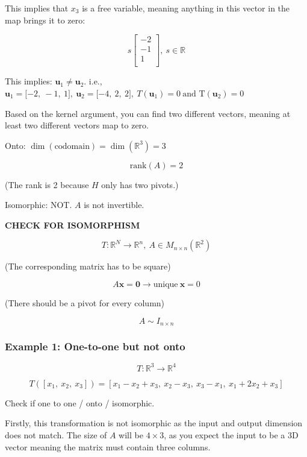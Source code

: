 \documentclass[
]{article}
\begin{document}
This implies that $x_{3}$ is a free variable, meaning anything in this
vector in the map brings it to zero:

$$s\begin{bmatrix}
 - 2 \\
 - 1 \\
1 \\
\end{bmatrix},\ s\mathbb{\in R}$$

This implies: ${\mathbf{u}}_{1} \neq {\mathbf{u}}_{2}$. i.e.,
${\mathbf{u}}_{1} = \lbrack - 2,\  - 1,\ 1\rbrack,\ {\mathbf{u}}_{2} = \lbrack - 4,\ 2,\ 2\rbrack,\ T\left( {\mathbf{u}}_{1} \right) = 0\ \text{and}\text{\ T}\left( {\mathbf{u}}_{2} \right) = 0$

Based on the kernel argument, you can find two different vectors,
meaning at least two different vectors map to zero.

Onto:
$\dim\left( \text{codomain} \right) = \dim\left( \mathbb{R}^{3} \right) = 3$

$$\text{rank}(A) = 2$$

(The rank is 2 because $H$ only has two pivots.)

Isomorphic: NOT. $A$ is not invertible.

\textbf{CHECK FOR ISOMORPHISM}

$$T:\mathbb{R}^{N} \rightarrow \mathbb{R}^{n},\ A \in M_{n \times n}\left( \mathbb{R}^{2} \right)$$

(The corresponding matrix has to be square)

$$A\mathbf{x} = \mathbf{0} \rightarrow \text{unique}\ \mathbf{x} = 0$$

(There should be a pivot for every column)

$$A\sim I_{n \times n}$$


\subsubsection{Example 1: One-to-one but not
onto}

$$T:\mathbb{R}^{3} \rightarrow \mathbb{R}^{4}$$

$$T\left( \left\lbrack x_{1},\ x_{2},\ x_{3} \right\rbrack \right) = \left\lbrack x_{1} - x_{2} + x_{3},\ x_{2} - x_{3},\ x_{3} - x_{1},\ x_{1} + 2x_{2} + x_{3} \right\rbrack$$

Check if one to one / onto / isomorphic.

Firstly, this transformation is not isomorphic as the input and output
dimension does not match. The size of $A$ will be $4 \times 3$, as
you expect the input to be a 3D vector meaning the matrix must contain
three columns.
\end{document}
